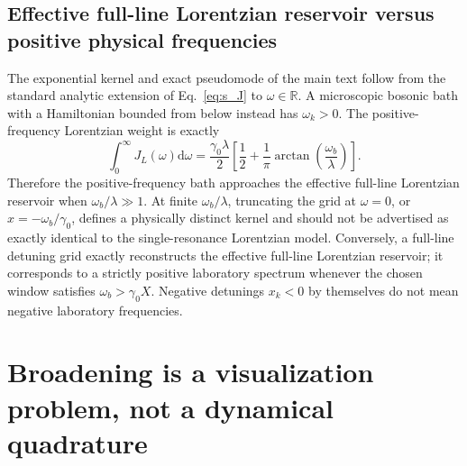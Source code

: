 \documentclass[reprint,superscriptaddress,floatfix,amsmath,amssymb,prresearch,aps]{revtex4-2}
\newcommand{\dd}{\mathrm{d}}
\begin{document}
\subsection{Effective full-line Lorentzian reservoir versus positive physical frequencies}
\label{sec:s_positive}

The exponential kernel and exact pseudomode of the main text follow from the
standard analytic extension of Eq.~\eqref{eq:s_J} to
\(\omega\in\mathbb R\). A microscopic bosonic bath with a Hamiltonian
bounded from below instead has \(\omega_k>0\). The positive-frequency
Lorentzian weight is exactly
\begin{equation}
\int_0^\infty J_L(\omega)\dd\omega
=\frac{\gamma_0\lambda}{2}
\left[\frac{1}{2}+\frac{1}{\pi}
\arctan\!\left(\frac{\omega_b}{\lambda}\right)\right].
\label{eq:s_positive_mass}
\end{equation}
Therefore the positive-frequency bath approaches the effective full-line
Lorentzian reservoir
when \(\omega_b/\lambda\gg1\). At finite \(\omega_b/\lambda\), truncating
the grid at \(\omega=0\), or \(x=-\omega_b/\gamma_0\), defines a physically
distinct kernel and should not be advertised as exactly identical to the
single-resonance Lorentzian model. Conversely, a full-line detuning grid
exactly reconstructs the effective full-line Lorentzian reservoir; it
corresponds to a strictly positive laboratory
spectrum whenever the chosen window satisfies
\(\omega_b>\gamma_0X\). Negative detunings \(x_k<0\) by themselves do not
mean negative laboratory frequencies.

\section{Broadening is a visualization problem, not a dynamical quadrature}
\label{sec:s_broadening}
\end{document}
